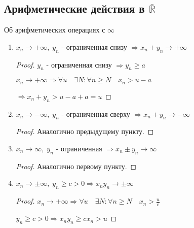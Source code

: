 \subsection{Арифметические действия в $\overline{\mathbb{R}}$}
    \begin{theorem-non} Об арифметических операциях с $\infty$ \end{theorem-non}
    \begin{enumerate}
        \item $x_n \to +\infty,\; y_n$ - ограниченная снизу $\Rightarrow x_n + y_n \to +\infty$
        \begin{proof}
            $y_n$ - ограниченная снизу $\Rightarrow y_n \geqslant a$ 
            
            $x_n \to +\infty \Rightarrow \forall u \quad \exists N: \forall n \geqslant N \quad x_n > u - a$ 
            
            $\Rightarrow x_n + y_n > u - a + a = u$
        \end{proof}
        \item $x_n \to -\infty,\; y_n$ - ограниченная сверху $\Rightarrow x_n + y_n \to -\infty$
        \begin{proof}
            Аналогично предыдущему пункту.
        \end{proof}
        \item $x_n \to \infty,\; y_n$ - ограниченная $\Rightarrow x_n \pm y_n \to \infty$
        \begin{proof}
            Аналогично первому пункту.
        \end{proof}
        \item $x_n \to \pm \infty,\; y_n \geqslant c > 0 \Rightarrow x_ny_n \to \pm \infty$
        \begin{proof}
            $x_n \to +\infty \Rightarrow \forall u \quad \exists N: \forall n \geqslant N \quad x_n>\frac{u}{c}$
            
            $y_n \geqslant c > 0 \Rightarrow x_ny_n \geqslant cx_n > u$
            

\end{proof}
\end{enumerate}
